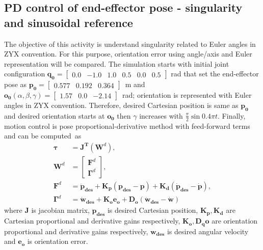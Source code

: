 \graphicspath{{images/act_3.2/}}
\subsection{PD control of end-effector pose - singularity and sinusoidal reference}
The objective of this activity is understand singularity related to Euler angles in ZYX convention. For this purpose, orientation error using angle/axis and Euler representation will be compared. The simulation starts with initial joint configuration $\mathbf{q_0}=\begin{bmatrix} 0.0 & -1.0 & 1.0 & 0.5 & 0.0 & 0.5 \end{bmatrix}$ rad that set the end-effector pose as $\mathbf{p_0}=\begin{bmatrix}  0.577 &   0.192 &   0.364 \end{bmatrix}$~m and $\mathbf{o_0}(\alpha, \beta, \gamma)= \begin{bmatrix} 1.57 & 0.0 & -2.14 \end{bmatrix}$~rad; orientation is represented with Euler angles in ZYX convention. Therefore, desired Cartesian position is same as $\mathbf{p_0}$ and desired orientation starts at $\mathbf{o_0}$ then $\gamma$ increases with $\frac{\pi}{2}\sin{0.4\pi t}$. Finally, motion control is pose proportional-derivative method with feed-forward terms and can be computed~as 
\begin{align}
	\boldsymbol{\tau} &= \mathbf{J^T} (\mathbf{W}^{d}), \label{eq:pose_PD_ff}
	\\
	\mathbf{W}^{d} &=
	\begin{bmatrix}
	\mathbf{F}^{d} \\ \boldsymbol{\Gamma}^{d}
	\end{bmatrix}, 
	\nonumber \\
	\mathbf{F}^{d} &= \mathbf{\ddot{p}_{des}} + \mathbf{K_p (p_{des}-p)} + \mathbf{K_d (\dot{p}_{des}-\dot{p})}, 
	\nonumber \\
	\boldsymbol{\Gamma}^{d} &= \mathbf{\dot{w}_{des}} + \mathbf{K_o e_o} + \mathbf{D_o (\dot{w}_{des}-\dot{w})} \nonumber
\end{align}
\noindent where $\mathbf{J}$ is jacobian matrix, $\mathbf{p_{des}}$ is desired Cartesian position, $\mathbf{K_p, K_d}$ are Cartesian proportional and derivative gains respectively, $\mathbf{K_o, D_qo}$ are orientation proportional and derivative gains respectively, $\mathbf{w_{des}}$ is desired angular velocity and $\mathbf{e_o}$ is orientation error. \vspace{.5cm}


